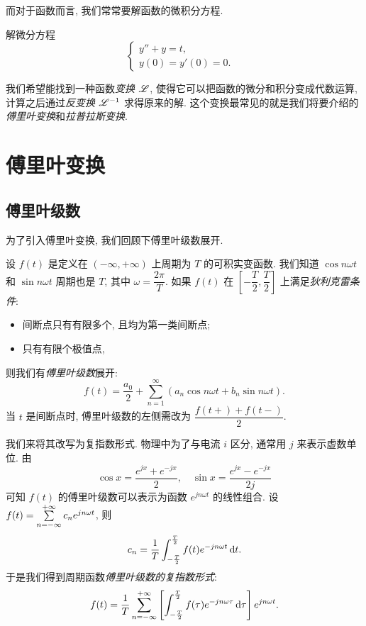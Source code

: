 \documentclass[nocolor,theme=doremi,lang=cn,11pt,chinese,twoside,openright,usesamecnt]{elegantbook}
\begin{document}
而对于函数而言, 我们常常要解函数的微积分方程.
\begin{example}
	解微分方程
	\[\begin{cases}
		y''+y=t,&\\
		y(0)=y'(0)=0.&
	\end{cases}\]
\end{example}
\begin{solution}
		我们希望能找到一种函数\emph{变换 $\mathscr{L}$}, 使得它可以把函数的微分和积分变成代数运算, 计算之后通过\emph{反变换 $\mathscr{L}^{-1}$} 求得原来的解.
		这个变换最常见的就是我们将要介绍的\emph{傅里叶变换}和\emph{拉普拉斯变换}.
\end{solution}

\section{傅里叶变换}

\subsection{傅里叶级数}

为了引入傅里叶变换, 我们回顾下傅里叶级数展开.

设 $f(t)$ 是定义在 $(-\infty,+\infty)$ 上周期为 $T$ 的可积实变函数.
我们知道 $\cos n\omega t$ 和 $\sin n\omega t$ 周期也是 $T$, 其中 $\omega=\dfrac{2\pi}T$.
如果 $f(t)$ 在 $\left[-\dfrac T2,\dfrac T2\right]$ 上满足\emph{狄利克雷条件}:
\begin{itemize}
	\item 间断点只有有限多个, 且均为第一类间断点;
	\item 只有有限个极值点,
\end{itemize}
则我们有\emph{傅里叶级数}展开:
	\[f(t)=\frac{a_0}2+\sum_{n=1}^\infty \left(a_n\cos n\omega t+b_n \sin n\omega t\right).\]
当 $t$ 是间断点时, 傅里叶级数的左侧需改为 $\dfrac{f(t+)+f(t-)}2$.

我们来将其改写为复指数形式.
物理中为了与电流 $i$ 区分, 通常用 $j$ 来表示虚数单位.
由
	\[\cos x=\frac{e^{jx}+e^{-jx}}2,\quad \sin x=\frac{e^{jx}-e^{-jx}}{2j}\]
可知 $f(t)$ 的傅里叶级数可以表示为函数 $e^{jn\omega t}$ 的线性组合.
设 $f(t)=\sum\limits_{n=-\infty}^{+\infty} c_n e^{jn\omega t}$, 则
\[c_n=\frac 1T \int_{-\frac T2}^{\frac T2} f(t)e^{-jn\omega t} \,\mathrm{d} t.\]
于是我们得到周期函数\emph{傅里叶级数的复指数形式}:
\[f(t)=\frac 1T\sum_{n=-\infty}^{+\infty}\left[\int_{-\frac T2}^{\frac T2}f(\tau)e^{-jn\omega\tau} \,\mathrm{d}\tau\right] e^{jn\omega t}.\]
\end{document}
